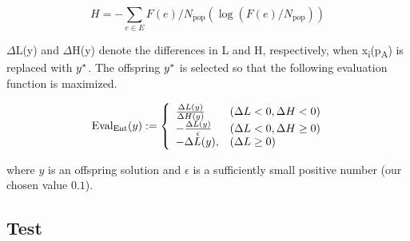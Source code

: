 \begin{equation}
H=-\sum_{e \in E} F(e) / N_{\mathrm{pop}}\left(\log \left(F(e) / N_{\mathrm{pop}}\right)\right)
\end{equation}

$\Delta$L(y) and $\Delta$H(y) denote the differences in L and H, respectively, when x\textsubscript{i}(p\textsubscript{A}) is replaced with $y\ssymbol{1}$. The offspring $y\ssymbol{1}$ is selected so that the following evaluation function is maximized.

\begin{equation}\text { Eval\textsubscript{Ent}}(y):=\left\{\begin{array}{ll}
\frac{\Delta L(y)}{\Delta H(y)} & (\Delta L<0, \Delta H<0) \\
-\frac{\Delta L(y)}{\epsilon} & (\Delta L<0, \Delta H \geq 0) \\
-\Delta L(y), & (\Delta L \geq 0)
\end{array}\right.\end{equation}

where $y$ is an offspring solution and $\epsilon$ is a sufficiently small positive number (our chosen value $0.1$).\\

\subsection{Test}

